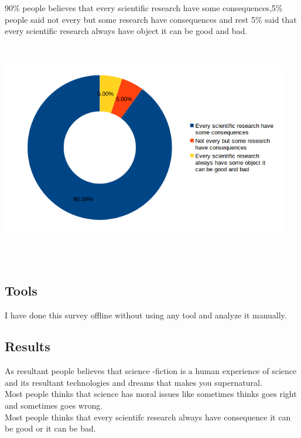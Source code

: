 \documentclass[12pt]{report}
\begin{document}
\subsubsection{}  90\% people believes that every scientific research have some consequences,5\% people said not every but some research have consequences and rest 5\% said that every scientific research always have object it can be good and bad.   
\\

\includegraphics[width=5in,height=4in]{6.png}
\newpage
\LARGE

\subsection{Tools}
\LARGE
I have done this survey offline without using any tool and analyze it manually.

\subsection{Results}
\LARGE
As resultant people believes that science -fiction is a human experience of science and its resultant technologies and dreams that makes you supernatural.\\
Most people thinks that science has moral issues like sometimes thinks goes right and sometimes goes wrong.\\
Most people thinks that every scientifc research always have consequence it can be good or it can be bad.
\end{document}
